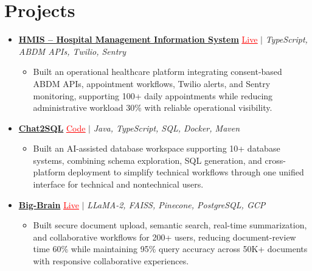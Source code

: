\documentclass[letterpaper,10pt]{article}
\newcommand{\itemTail}{\vspace{-5pt}}
\newcommand{\projGap}{\vspace{3pt}}
\newcommand{\resumeItem}[1]{\item\small{{#1 \itemTail}}}
\newcommand{\resumeProjectHeading}[1]{\item \small #1 \vspace{-2pt}}
\newcommand{\resumeProjectLink}[2]{\href{#1}{\textcolor{red}{\underline{#2}}}}
\newcommand{\resumeSubHeadingListStart}{\begin{itemize}[leftmargin=0.0in, label={}]}
\newcommand{\resumeSubHeadingListEnd}{\end{itemize}}
\newcommand{\resumeProjItemListStart}{\begin{itemize}[leftmargin=0.15in,label=\textbullet,itemsep=3pt,topsep=0pt,parsep=0pt,partopsep=0pt]}
\newcommand{\resumeProjItemListEnd}{\end{itemize}\vspace{-4pt}}
\begin{document}
\section{Projects}
\resumeSubHeadingListStart
\vspace{-2pt}
\resumeProjectHeading{\href{https://hims-rouge.vercel.app/}{\textbf{HMIS -- Hospital Management Information System}} \resumeProjectLink{https://hims-rouge.vercel.app/}{Live} $|$ \emph{TypeScript, ABDM APIs, Twilio, Sentry}}
\resumeProjItemListStart
\resumeItem{Built an operational healthcare platform integrating consent-based ABDM APIs, appointment workflows, Twilio alerts, and Sentry monitoring, supporting 100+ daily appointments while reducing administrative workload 30\% with reliable operational visibility.}
\resumeProjItemListEnd
\projGap
\resumeProjectHeading{\href{https://github.com/SAHAJ-BHADJA/Chat2SQL}{\textbf{Chat2SQL}} \resumeProjectLink{https://github.com/SAHAJ-BHADJA/Chat2SQL}{Code} $|$ \emph{Java, TypeScript, SQL, Docker, Maven}}
\resumeProjItemListStart
\resumeItem{Built an AI-assisted database workspace supporting 10+ database systems, combining schema exploration, SQL generation, and cross-platform deployment to simplify technical workflows through one unified interface for technical and nontechnical users.}
\resumeProjItemListEnd
\projGap
\resumeProjectHeading{\href{https://big-brain-pied.vercel.app/}{\textbf{Big-Brain}} \resumeProjectLink{https://big-brain-pied.vercel.app/}{Live} $|$ \emph{LLaMA-2, FAISS, Pinecone, PostgreSQL, GCP}}
\resumeProjItemListStart
\resumeItem{Built secure document upload, semantic search, real-time summarization, and collaborative workflows for 200+ users, reducing document-review time 60\% while maintaining 95\% query accuracy across 50K+ documents with responsive collaborative experiences.}
\resumeProjItemListEnd
\resumeSubHeadingListEnd
\end{document}
